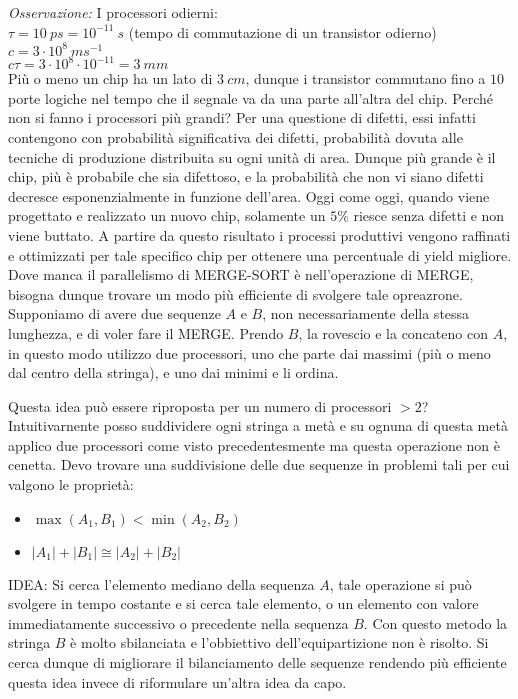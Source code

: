 \documentclass[a4paper,portrait,12pt]{article}
\theoremstyle{definition}
\providecommand{\abs}[1]{\lvert#1\rvert}
\begin{document}
\textit{Osservazione:} I processori odierni:\\
$\tau = 10\ ps = 10^{-11}\ s$ (tempo di commutazione di un transistor odierno)\\
$c = 3 \cdot 10^8\ ms^{-1}$\\
$c\tau = 3 \cdot 10^8 \cdot 10^{-11} = 3\ mm$\\
Più o meno un chip ha un lato di $3\ cm$, dunque i transistor commutano fino a $10$ porte logiche nel tempo che il segnale va da una parte all’altra del chip.
Perché non si fanno i processori più grandi?
Per una questione di difetti, essi infatti contengono con probabilità significativa dei difetti,
probabilità dovuta alle tecniche di produzione distribuita su ogni unità di area.
Dunque più grande è il chip, più è probabile che sia difettoso, e la probabilità che non vi siano difetti decresce esponenzialmente in funzione dell’area.
Oggi come oggi, quando viene progettato e realizzato un nuovo chip, solamente un $5\%$ riesce senza difetti e non viene buttato.
A partire da questo risultato i processi produttivi vengono raffinati e ottimizzati per tale specifico chip per ottenere una percentuale di yield migliore.
Dove manca il parallelismo di MERGE-SORT è nell’operazione di MERGE, bisogna dunque trovare un modo più efficiente di svolgere tale opreazrone.
Supponiamo di avere due sequenze $A$ e $B$, non necessariamente della stessa lunghezza, e di voler fare il MERGE.
Prendo $B$, la rovescio e la concateno con $A$, in questo modo utilizzo due processori, uno che parte dai massimi (più o meno dal centro della stringa), e uno dai minimi e li ordina.

Questa idea può essere riproposta per un numero di processori $> 2$?
Intuitivarnente posso suddividere ogni stringa a metà e su ognuna di questa metà applico due processori come visto precedentesmente ma questa operazione non è cenetta.
Devo trovare una suddivisione delle due sequenze in problemi tali per cui valgono le proprietà:
\begin{itemize}
\item $\max(A_1, B_1) < \min(A_2, B_2)$
\item $\abs{A_1} + \abs{B_1} \cong \abs{A_2} + \abs{B_2}$
\end{itemize}

IDEA: Si cerca l’elemento mediano della sequenza $A$, tale operazione si può svolgere in tempo costante e si cerca tale elemento, o un elemento con valore immediatamente successivo o precedente nella sequenza $B$.
Con questo metodo la stringa $B$ è molto sbilanciata e l’obbiettivo dell’equipartizione non è risolto.
Si cerca dunque di migliorare il bilanciamento delle sequenze rendendo più efficiente questa idea invece di riformulare un’altra idea da capo.
\end{document}
